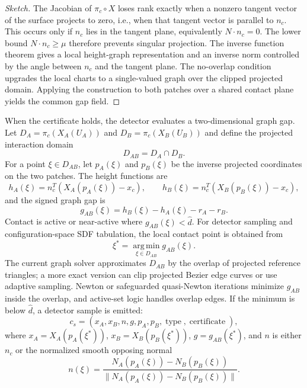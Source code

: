 \documentclass[preprint,12pt]{elsarticle}
\newcommand{\argmin}{\operatorname*{arg\,min}}
\begin{document}
\begin{proof}[Sketch]
The Jacobian of $\pi_c\circ X$ loses rank exactly when a nonzero tangent vector of the surface projects to zero, i.e., when that tangent vector is parallel to $n_c$. This occurs only if $n_c$ lies in the tangent plane, equivalently $N\cdot n_c=0$. The lower bound $N\cdot n_c\ge\mu$ therefore prevents singular projection. The inverse function theorem gives a local height-graph representation and an inverse norm controlled by the angle between $n_c$ and the tangent plane. The no-overlap condition upgrades the local charts to a single-valued graph over the clipped projected domain. Applying the construction to both patches over a shared contact plane yields the common gap field.
\end{proof}

When the certificate holds, the detector evaluates a two-dimensional graph gap.
\label{subsec:graph_gap}
Let $D_A=\pi_c(X_A(U_A))$ and $D_B=\pi_c(X_B(U_B))$ and define the projected interaction domain
\begin{equation}
    D_{AB}=D_A\cap D_B.
\end{equation}
For a point $\xi\in D_{AB}$, let $p_A(\xi)$ and $p_B(\xi)$ be the inverse projected coordinates on the two patches. The height functions are
\begin{equation}
    h_A(\xi)=n_c^T(X_A(p_A(\xi))-x_c),
    \qquad
    h_B(\xi)=n_c^T(X_B(p_B(\xi))-x_c),
\end{equation}
and the signed graph gap is
\begin{equation}
    g_{AB}(\xi)=h_B(\xi)-h_A(\xi)-r_A-r_B.
    \label{eq:graph_gap}
\end{equation}
Contact is active or near-active where $g_{AB}(\xi)<\hat d$. For detector sampling and configuration-space SDF tabulation, the local contact point is obtained from
\begin{equation}
    \xi^*=\argmin_{\xi\in D_{AB}} g_{AB}(\xi).
    \label{eq:xi_min}
\end{equation}
The current graph solver approximates $D_{AB}$ by the overlap of projected reference triangles; a more exact version can clip projected Bezier edge curves or use adaptive sampling. Newton or safeguarded quasi-Newton iterations minimize $g_{AB}$ inside the overlap, and active-set logic handles overlap edges. If the minimum is below $\hat d$, a detector sample is emitted:
\begin{equation}
    c_s=(x_A,x_B,n,g,p_A,p_B,\operatorname{type},\operatorname{certificate}),
\end{equation}
where $x_A=X_A(p_A(\xi^*))$, $x_B=X_B(p_B(\xi^*))$, $g=g_{AB}(\xi^*)$, and $n$ is either $n_c$ or the normalized smooth opposing normal
\begin{equation}
    n(\xi)=\frac{N_A(p_A(\xi))-N_B(p_B(\xi))}{\|N_A(p_A(\xi))-N_B(p_B(\xi))\|}.
    \label{eq:smooth_opposing_normal}
\end{equation}
\end{document}
